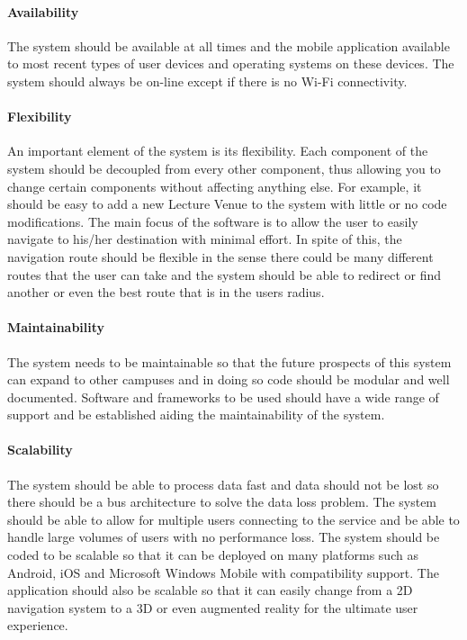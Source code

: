 \documentclass[runningheads,a4paper]{article}
\begin{document}
\paragraph{\textbf{Availability} \\}
 The system should be available at all times and the mobile application available to most recent types of user devices and operating systems on these devices. The system should always be on-line except if there is no Wi-Fi connectivity.

\paragraph{\textbf{Flexibility} \\}
 An important element of the system is its flexibility. 
 Each component of the system should be decoupled from every other component, thus allowing you to change certain components without affecting anything else. 
 For example, it should be easy to add a new Lecture Venue to the system with little or no code modifications. 
 The main focus of the software is to allow the user to easily navigate to his/her destination with minimal effort.
 In spite of this, the navigation route should be flexible in the sense there could be many different routes that the user can take and the system should be able to redirect or find another or even the best route that is in the users radius.

\paragraph{\textbf{Maintainability} \\}
 The system needs to be maintainable so that the future prospects of this system can expand to other campuses and in doing so code should be modular and well documented. Software and frameworks to be used should have a wide range of support and be established aiding the maintainability of the system.

\paragraph{\textbf{Scalability} \\}
 The system should be able to process data fast and data should not be lost so there should be a bus architecture to solve the data loss problem. The system should be able to allow for multiple users connecting to the service and be able to handle large volumes of users with no performance loss. The system should be coded to be scalable so that it can be deployed on many platforms such as Android, iOS and Microsoft Windows Mobile with compatibility support. The application should also be scalable so that it can easily change from a 2D navigation system to a 3D or even augmented reality for the ultimate user experience.
\end{document}
